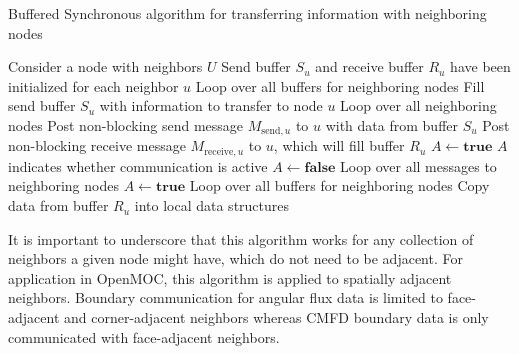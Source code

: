 \begin{algorithm*}[!h]
	\caption{Buffered Synchronous algorithm for transferring information with neighboring nodes}
	\label{alg:Buffered Synchronous}
	\begin{algorithmic}
		\State Consider a node with neighbors $U$ \hspace{\fill}
		\State Send buffer $S_u$ and receive buffer $R_u$ have been initialized for each neighbor $u$ \hspace{\fill}
		\vspace{0.1in}
		 \Comment Loop over all buffers for neighboring nodes
		\vspace{0.1in}
		\State Fill send buffer $S_u$ with information to transfer to node $u$
		\vspace{0.1in}
		\EndFor
		\vspace{0.1in}
		 \Comment Loop over all neighboring nodes
		\vspace{0.1in}
		\State Post non-blocking send message $M_{\text{send},u}$ to $u$ with data from buffer $S_u$
		\State Post non-blocking receive message $M_{\text{receive},u}$ to $u$, which will fill buffer $R_u$
		\vspace{0.1in}
		\EndFor
		\vspace{0.1in}
		\State $A \gets \textbf{true}$ \Comment $A$ indicates whether communication is active
		\vspace{0.1in}
		\State $A \gets \textbf{false}$
		 \Comment Loop over all messages to neighboring nodes
		\vspace{0.1in}
		\State $A \gets \textbf{true}$
		\EndIf
		\vspace{0.1in}
		\EndFor
		\EndWhile
		\vspace{0.1in}
		 \Comment Loop over all buffers for neighboring nodes
		\vspace{0.1in}
		\State Copy data from buffer $R_u$ into local data structures
		\vspace{0.1in}
		\EndFor
	\end{algorithmic}
\end{algorithm*}

It is important to underscore that this algorithm works for any collection of neighbors a given node might have, which do not need to be adjacent. For application in OpenMOC, this algorithm is applied to spatially adjacent neighbors. Boundary communication for angular flux data is limited to face-adjacent and corner-adjacent neighbors whereas \ac{CMFD} boundary data is only communicated with face-adjacent neighbors.

